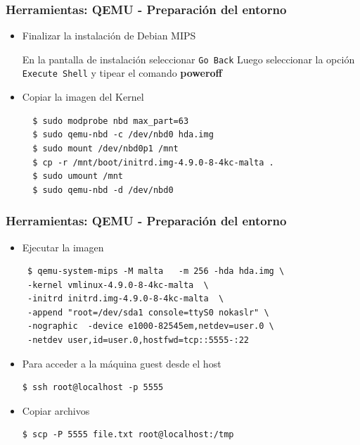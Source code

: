 \documentclass{beamer}
\begin{document}
 \begin{frame}[fragile]
 \frametitle{Herramientas: QEMU - Preparación del entorno}
 \begin{itemize}
  \item Finalizar la instalación de Debian MIPS
  
  En la pantalla de instalación seleccionar \texttt{Go Back} Luego seleccionar la opción \texttt{Execute Shell} y tipear el comando \textbf{poweroff}
  
 \item Copiar la imagen del Kernel
\begin{lstlisting} 
  $ sudo modprobe nbd max_part=63
  $ sudo qemu-nbd -c /dev/nbd0 hda.img 
  $ sudo mount /dev/nbd0p1 /mnt
  $ cp -r /mnt/boot/initrd.img-4.9.0-8-4kc-malta .
  $ sudo umount /mnt 
  $ sudo qemu-nbd -d /dev/nbd0
\end{lstlisting}

\end{itemize}
  \end{frame}

  \begin{frame}[fragile]
 \frametitle{Herramientas: QEMU - Preparación del entorno} 
 \begin{itemize}
  \item Ejecutar la imagen
\begin{lstlisting}
 $ qemu-system-mips -M malta   -m 256 -hda hda.img \
 -kernel vmlinux-4.9.0-8-4kc-malta  \
 -initrd initrd.img-4.9.0-8-4kc-malta  \
 -append "root=/dev/sda1 console=ttyS0 nokaslr" \
 -nographic  -device e1000-82545em,netdev=user.0 \
 -netdev user,id=user.0,hostfwd=tcp::5555-:22
\end{lstlisting}
\item Para acceder a la máquina guest desde el host
\begin{lstlisting}
$ ssh root@localhost -p 5555
\end{lstlisting}

\item Copiar archivos
\begin{lstlisting}
$ scp -P 5555 file.txt root@localhost:/tmp
\end{lstlisting}

\end{itemize}
  \end{frame}
  
\end{document}
